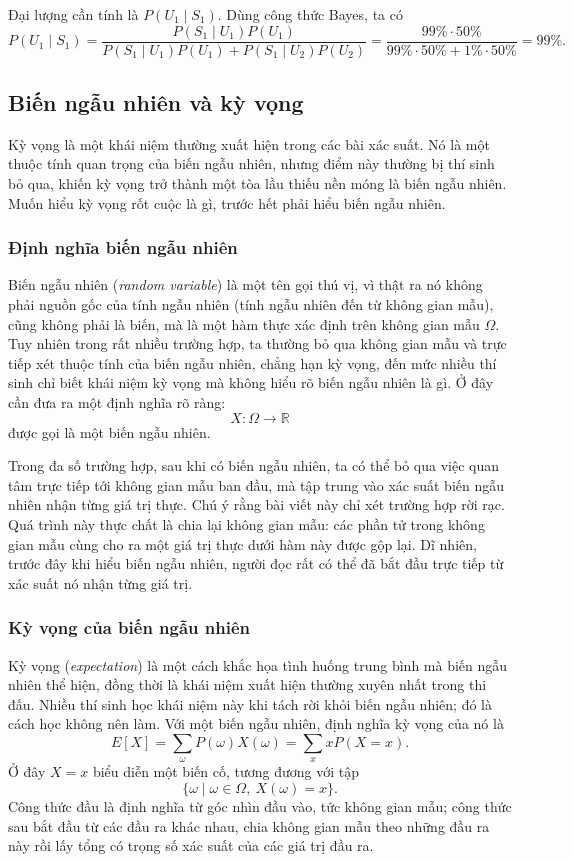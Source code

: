 \documentclass[11pt]{article}
\begin{document}
Đại lượng cần tính là \(P(U_1\mid S_1)\). Dùng công thức Bayes, ta có
\[
  P(U_1\mid S_1)
  =
  \frac{P(S_1\mid U_1)P(U_1)}
       {P(S_1\mid U_1)P(U_1)+P(S_1\mid U_2)P(U_2)}
  =
  \frac{99\%\cdot 50\%}{99\%\cdot 50\%+1\%\cdot 50\%}
  =99\%.
\]

\subsection{Biến ngẫu nhiên và kỳ vọng}

Kỳ vọng là một khái niệm thường xuất hiện trong các bài xác suất. Nó là một
thuộc tính quan trọng của biến ngẫu nhiên, nhưng điểm này thường bị thí sinh
bỏ qua, khiến kỳ vọng trở thành một tòa lầu thiếu nền móng là biến ngẫu
nhiên. Muốn hiểu kỳ vọng rốt cuộc là gì, trước hết phải hiểu biến ngẫu
nhiên.

\subsubsection{Định nghĩa biến ngẫu nhiên}

Biến ngẫu nhiên (\emph{random variable}) là một tên gọi thú vị, vì thật ra nó
không phải nguồn gốc của tính ngẫu nhiên (tính ngẫu nhiên đến từ không gian
mẫu), cũng không phải là biến, mà là một hàm thực xác định trên không gian
mẫu \(\Omega\). Tuy nhiên trong rất nhiều trường hợp, ta thường bỏ qua không
gian mẫu và trực tiếp xét thuộc tính của biến ngẫu nhiên, chẳng hạn kỳ vọng,
đến mức nhiều thí sinh chỉ biết khái niệm kỳ vọng mà không hiểu rõ biến ngẫu
nhiên là gì. Ở đây cần đưa ra một định nghĩa rõ ràng:
\[
  X:\Omega\to\mathbb{R}
\]
được gọi là một biến ngẫu nhiên.

Trong đa số trường hợp, sau khi có biến ngẫu nhiên, ta có thể bỏ qua việc
quan tâm trực tiếp tới không gian mẫu ban đầu, mà tập trung vào xác suất biến
ngẫu nhiên nhận từng giá trị thực. Chú ý rằng bài viết này chỉ xét trường
hợp rời rạc. Quá trình này thực chất là chia lại không gian mẫu: các phần tử
trong không gian mẫu cùng cho ra một giá trị thực dưới hàm này được gộp lại.
Dĩ nhiên, trước đây khi hiểu biến ngẫu nhiên, người đọc rất có thể đã bắt đầu
trực tiếp từ xác suất nó nhận từng giá trị.

\subsubsection{Kỳ vọng của biến ngẫu nhiên}

Kỳ vọng (\emph{expectation}) là một cách khắc họa tình huống trung bình mà
biến ngẫu nhiên thể hiện, đồng thời là khái niệm xuất hiện thường xuyên nhất
trong thi đấu. Nhiều thí sinh học khái niệm này khi tách rời khỏi biến ngẫu
nhiên; đó là cách học không nên làm. Với một biến ngẫu nhiên, định nghĩa kỳ
vọng của nó là
\[
  E[X]=\sum_{\omega}P(\omega)X(\omega)=\sum_x xP(X=x).
\]
Ở đây \(X=x\) biểu diễn một biến cố, tương đương với tập
\[
  \{\omega\mid \omega\in\Omega,\ X(\omega)=x\}.
\]
Công thức đầu là định nghĩa từ góc nhìn đầu vào, tức không gian mẫu; công
thức sau bắt đầu từ các đầu ra khác nhau, chia không gian mẫu theo những đầu
ra này rồi lấy tổng có trọng số xác suất của các giá trị đầu ra.
\end{document}
